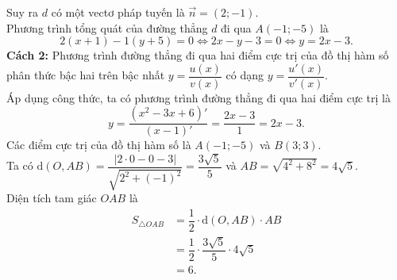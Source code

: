 \begin{ex}
{\begin{itemchoice}
			Suy ra $d$ có một vectơ pháp tuyến là $\overrightarrow{n} = (2; -1)$.\\			
			Phương trình tổng quát của đường thẳng $d$ đi qua $A(-1; -5)$ là
			\[ 2(x+1) - 1(y+5)=0 \Leftrightarrow 2x-y-3 = 0 \Leftrightarrow y = 2x-3. \]
			\textbf{Cách 2:}		
			Phương trình đường thẳng đi qua hai điểm cực trị của đồ thị hàm số phân thức bậc hai trên bậc nhất $y = \dfrac{u(x)}{v(x)}$ có dạng $y = \dfrac{u'(x)}{v'(x)}$.\\
			Áp dụng công thức, ta có phương trình đường thẳng đi qua hai điểm cực trị là
			\[y = \dfrac{\left(x^2-3x+6\right)'}{(x-1)'} = \dfrac{2x-3}{1} = 2x-3.\]
			\itemch Các điểm cực trị của đồ thị hàm số là $A(-1;-5)$ và $B(3; 3)$.\\
			Ta có $\mathrm{d}(O,AB)=\dfrac{|2\cdot 0-0-3|}{\sqrt{2^2+(-1)^2}}=\dfrac{3\sqrt{5}}{5}$ và $AB=\sqrt{4^2+8^2}=4\sqrt{5}$.\\
			Diện tích tam giác $OAB$ là
			\allowdisplaybreaks
			\begin{align*}
				S_{\triangle OAB} &= \dfrac{1}{2}\cdot \mathrm{d}(O,AB)\cdot AB\\
				&=\dfrac{1}{2}\cdot\dfrac{3\sqrt{5}}{5}\cdot 4\sqrt{5}\\
				&=6.
			\end{align*}
		\end{itemchoice}
	}
\end{ex}

